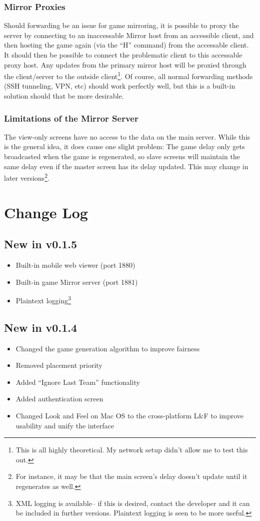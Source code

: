 \documentclass[10pt,a4paper]{report}
\begin{document}
\subsection{Mirror Proxies}
Should forwarding be an issue for game mirroring, it is possible to proxy the server by connecting to an inaccessable Mirror host from an accessible client, and then hosting the game again (via the ``H'' command) from the accessable client.  It should then be possible to connect the problematic client to this accessable proxy host.  Any updates from the primary mirror host will be proxied through the client/server to the outside client\footnote{This is all highly theoretical.  My network setup didn't allow me to test this out.}.  Of course, all normal forwarding methods (SSH tunneling, VPN, etc) should work perfectly well, but this is a built-in solution should that be more desirable.

\subsection{Limitations of the Mirror Server}
The view-only screens have no access to the data on the main server.  While this is the general idea, it does cause one slight problem:  The game delay only gets broadcasted when the game is regenerated, so slave screens will maintain the same delay even if the master screen has its delay updated.  This may change in later versions\footnote{For instance, it may be that the main screen's delay doesn't update until it regenerates as well.}.

\chapter{Change Log}
\section{New in v0.1.5}
\begin{itemize}
\item Built-in mobile web viewer (port 1880)
\item Built-in game Mirror server (port 1881)
\item Plaintext logging\footnote{XML logging is available-- if this is desired, contact the developer and it can be included in further versions.  Plaintext logging is seen to be more useful.}
\end{itemize}
\section{New in v0.1.4}
\begin{itemize}
\item Changed the game generation algorithm to improve fairness
\item Removed placement priority
\item Added ``Ignore Last Team'' functionality
\item Added authentication screen
\item Changed Look and Feel on Mac OS to the cross-platform L\&F to improve usability and unify the interface
\end{itemize}
\end{document}
